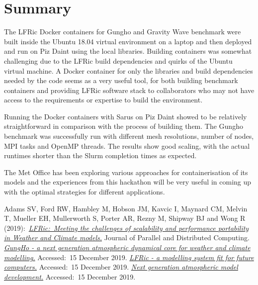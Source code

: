 \documentclass[twoside,a4paper,12pt]{article}
\begin{document}
%
\section{Summary}\label{summary}

The LFRic Docker containers for Gungho and Gravity Wave benchmark were built
inside the Ubuntu 18.04 virtual environment on a laptop and then deployed and
run on Piz Daint using the local libraries. Building containers was somewhat
challenging due to the LFRic build dependencies and quirks of the Ubuntu virtual
machine. A Docker container for only the libraries and build dependencies needed
by the code seems as a very useful tool, for both building benchmark containers
and providing LFRic software stack to collaborators who may not have access to
the requirements or expertise to build the environment.

Running the Docker containers with Sarus on Piz Daint showed to be relatively
straightforward in comparison with the process of building them. The Gungho
benchmark was successfully run with different mesh resolutions, number of nodes,
MPI tasks and OpenMP threads. The results show good scaling, with the actual
runtimes shorter than the Slurm completion times as expected.

The Met Office has been exploring various approaches for containerisation
of its models and the experiences from this hackathon will be very useful in
coming up with the optimal strategies for different applications.
%
%
\begin{thebibliography}{unsrt}
%
 Adams SV, Ford RW, Hambley M, Hobson JM, Kavcic I, Maynard
CM, Melvin T, Mueller EH, Mullerworth S, Porter AR, Rezny M, Shipway BJ and
Wong R (2019):\ \href{https://doi.org/10.1016/j.jpdc.2019.02.007}
{\em LFRic:\ Meeting the challenges of scalability and performance portability
in Weather and Climate models.} Journal of Parallel and Distributed Computing.
%
 \href{https://www.metoffice.gov.uk/research/foundation/dynamics/next-generation}
{\em GungHo - a next generation atmospheric dynamical core for weather and
climate modelling.} Accessed:\ 15 December 2019.
%
 \href{https://www.metoffice.gov.uk/research/approach/modelling-systems/lfric}
{\em LFRic - a modelling system fit for future computers.}
Accessed:\ 15 December 2019.
%
 \href{https://www.metoffice.gov.uk/research/news/2019/gungho-and-lfric}
{\em Next generation atmospheric model development.} Accessed:\ 15 December 2019.
\end{thebibliography}
%
%
\appendix
\end{document}
